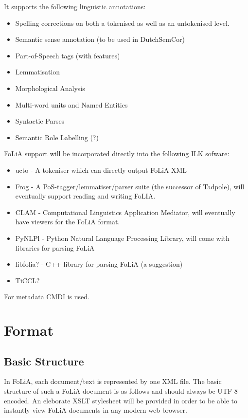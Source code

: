It supports the following linguistic annotations:

\begin{itemize}
\item Spelling corrections on both a tokenised as well as an untokenised level.
\item Semantic sense annotation (to be used in DutchSemCor)
\item Part-of-Speech tags (with features)
\item Lemmatisation
\item Morphological Analysis
\item Multi-word units and Named Entities
\item Syntactic Parses
\item Semantic Role Labelling (?)
\end{itemize}

FoLiA support will be incorporated directly into the following ILK sofware:


\begin{itemize} 
\item ucto - A tokeniser which can directly output FoLiA XML 
\item Frog - A PoS-tagger/lemmatiser/parser suite (the successor of Tadpole), will eventually support reading and writing FoLIA.
\item CLAM - Computational Linguistics Application Mediator, will eventually have viewers for the FoLiA format.
\item PyNLPl - Python Natural Language Processing Library, will come with libraries for parsing FoLiA
\item libfolia? - C++ library for parsing FoLiA (a suggestion)
\item TiCCL?
\end{itemize}

For metadata CMDI is used.

\section{Format}

\subsection{Basic Structure}

In FoLiA, each document/text is represented by one XML file. The basic structure of such a FoLiA document is as follows and should always be UTF-8 encoded. An eleborate XSLT stylesheet will be provided in order to be able to instantly view FoLiA documents in any modern web browser.


